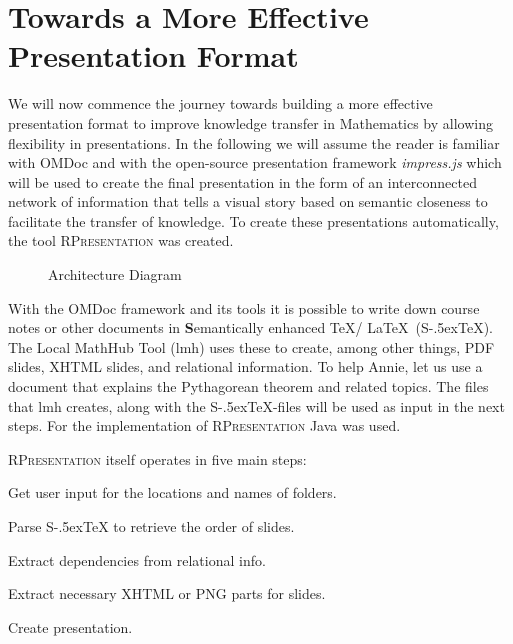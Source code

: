 \documentclass{llncs}
\def\stex{\texorpdfstring{\raisebox{-.5ex}S\kern-.5ex\TeX}{sTeX}\xspace}
\def\sTeX{\stex}
\newcommand{\sys}{\textsc{RPresentation}\xspace}
\begin{document}
\section{Towards a More Effective Presentation Format}
\label{sec:TowardsAMoreEffectivePresentationFormat}

We will now commence the journey towards building a more effective presentation format to improve knowledge transfer in Mathematics by allowing flexibility in presentations. In the following we will assume the reader is familiar with OMDoc \cite{Kohlhase:OMDoc1.2} and with the open-source presentation framework \textit{impress.js} \cite{JSImpress:npentrel14} which will be used to create the final presentation in the form of an interconnected network of information that tells a visual story based on semantic closeness to facilitate the transfer of knowledge. To create these presentations automatically, the tool \sys \cite{npentrel:npentrel15} was created. 

\begin{figure}\centering\vspace{-2em}
  \vspace{-1.7em}
  \caption{Architecture Diagram}\label{fig:architecture}
  \vspace{-1.5em}
\end{figure}

With the OMDoc framework and its tools it is possible to write down course notes or other documents in \textbf{S}emantically enhanced \TeX / \LaTeX\ (\stex). The Local MathHub Tool (lmh) uses these to create, among other things, PDF slides, XHTML slides, and relational information. To help Annie, let us use a document that explains the Pythagorean theorem and related topics. The files that lmh creates, along with the \stex -files will be used as input in the next steps. For the implementation of  \sys Java was used.

\sys itself operates in five main steps:
\begin{compactenum}
\item Get user input for the locations and names of folders.
\item Parse \sTeX to retrieve the order of slides.
\item Extract dependencies from relational info.
\item Extract necessary XHTML or PNG parts for slides.
\item Create presentation.
\end{compactenum}
\end{document}
